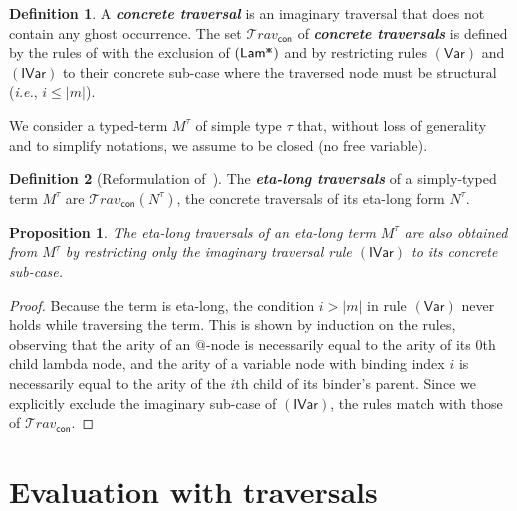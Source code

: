 \documentclass[xchauthor,chkrefs,GCNS,amsmath,amsthm,rotating,leaveRGB]{tcsg}
\renewcommand{\index}[1]{}
\theoremstyle{plain}
\newtheorem{proposition}[theorem]{Proposition}
\theoremstyle{definition}
\newtheorem{definition}{Definition}[section]
\newcommand{\concrete}{\mathsf{con}}
\newcommand{\ghostvar}{\mathsf{x\mkern-5mu x}}
\begin{document}
\begin{definition}\label{def:concrete_traversals}
A \textbf{\emph{concrete traversal}}\index{concrete traversal} is an
imaginary traversal that does not contain any ghost occurrence. The set
$\mathcal {T}\!rav_{\concrete} $ of \textbf{\emph{concrete
traversals}}\index{concrete traversals} is defined by the rules of
 with the exclusion of
$\mathsf{(Lam^{\ghostvar}  )}$ and by restricting rules $\mathsf{(Var)}$ and
$\mathsf{(IVar)}$ to their concrete sub-case where the traversed node must be
structural (\textit{i.e.}, $i\leq |m|$).
\end{definition}

We consider a typed-term $M^\tau $ of simple type $\tau $ that, without loss
of generality and to simplify notations, we assume to be closed (no free
variable).

\begin{definition}[Reformulation of~\cite{BlumPhd}]
The \textbf{\emph{eta-long traversals}}\index{eta-long traversals} of a
simply-typed term $M^\tau $ are $\mathcal {T}\!rav_{\concrete }(N^\tau )$,
the concrete traversals of its eta-long form $N^\tau $.
\end{definition}

\begin{proposition}\label{prop:ulc_and_stlc_trav_coincide}
The eta-long traversals of an eta-long term $M^\tau $ are also obtained from
$M^\tau $ by restricting only the imaginary traversal rule $\mathsf{(IVar)}$
to its concrete sub-case.
\end{proposition}

\begin{proof}
Because the term is eta-long, the condition $i>|m|$ in rule $\mathsf{(Var)}$
never holds while traversing the term. This is shown by induction on the
rules, observing that the arity of an $@$-node is necessarily equal to the
arity of its $0$th child lambda node, and the arity of a variable node with
binding index $i$ is necessarily equal to the arity of the $i$th child of its
binder's parent. Since we explicitly exclude the imaginary sub-case of
$\mathsf{(IVar)}$, the rules match with those of $\mathcal
{T}\!rav_{\concrete} $.
\end{proof}

\section{Evaluation with traversals}\label{sec:normalizing_trav}
\end{document}
